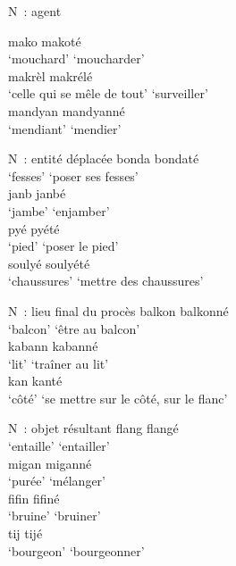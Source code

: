\documentclass[output=paper]{langsci/langscibook}
\begin{document}
\ex \label{ex:VilloingDeglas:27} N~: agent

  \ea \gll mako \textrightarrow{} makoté\\
  {`mouchard'} {} {`moucharder'}\\
  \ex \gll makrèl \textrightarrow{} makrélé\\
  {`celle qui se mêle de tout'} {} {`surveiller'}\\
  \ex \gll mandyan \textrightarrow{} mandyanné\\
  {`mendiant'} {} {`mendier'}\\
  \z

\ex \label{ex:VilloingDeglas:28}

  \ea\label{ex:VilloingDeglas:28a} N~: entité déplacée
  \ea \gll bonda \textrightarrow{} bondaté\\
  {`fesses'} {} {`poser ses fesses'}\\
  \ex \gll janb \textrightarrow{} janbé\\
  {`jambe'} {} {`enjamber'}\\
  \ex \gll pyé \textrightarrow{} pyété\\
  {`pied'} {} {`poser le pied'}\\
  \ex \gll soulyé \textrightarrow{} soulyété\\
  {`chaussures'} {} {`mettre des chaussures'}\\
  \z\z

  \ea\label{ex:VilloingDeglas:28b} N~: lieu final du procès
  \ea \gll balkon \textrightarrow{} balkonné \\
  `balcon' {} {`être au balcon'}\\
  \ex \gll kabann \textrightarrow{} kabanné\\
  {`lit'} {} {`traîner au lit'}\\
  \ex \gll kan \textrightarrow{} kanté\\
  {`côté'} {} {`se mettre sur le côté, sur le flanc'}\\
  \z\z

\ex \label{ex:VilloingDeglas:29} N~: objet résultant
  \ea \gll flang \textrightarrow{} flangé\\
  {`entaille'} {} {`entailler'}\\
  \ex \gll migan \textrightarrow{} miganné\\
  {`purée'} {} {`mélanger'}\\
  \ex \gll fifin \textrightarrow{} fifiné\\
  {`bruine'} {} {`bruiner'}\\
  \ex \gll tij \textrightarrow{} tijé\\
  {`bourgeon'} {} {`bourgeonner'}\\
\z\z
\end{document}
